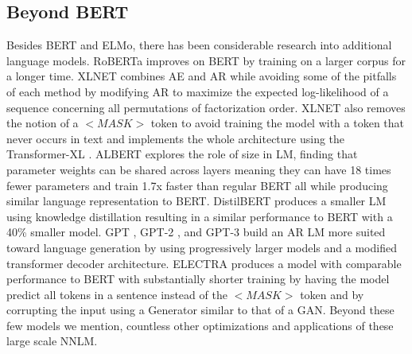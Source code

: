 \subsection{Beyond BERT}
\label{chap:prior:sec:lm:otherlm}
Besides BERT and ELMo, there has been considerable research into additional language models. RoBERTa \cite{Liu2019RoBERTaAR} improves on BERT by training on a larger corpus for a longer time. XLNET \cite{Yang2019XLNetGA} combines AE and AR while avoiding some of the pitfalls of each method by modifying AR to maximize the expected log-likelihood of a sequence concerning all permutations of factorization order. XLNET also removes the notion of a $<MASK>$ token to avoid training the model with a token that never occurs in text and implements the whole architecture using the Transformer-XL \cite{Dai2019TransformerXLAL}. ALBERT \cite{Lan2019ALBERTAL} explores the role of size in LM, finding that parameter weights can be shared across layers meaning they can have 18 times fewer parameters and train 1.7x faster than regular BERT all while producing similar language representation to BERT. DistilBERT \cite{Sanh2019DistilBERTAD} produces a smaller LM using knowledge distillation resulting in a similar performance to BERT with a 40\% smaller model. GPT \cite{Radford2018ImprovingLU}, GPT-2 \cite{Radford2019LanguageMA}, and GPT-3 \cite{Brown2020LanguageMA}  build an AR LM more suited toward language generation by using progressively larger models and a modified transformer decoder architecture. ELECTRA \cite{Clark2020ELECTRAPT} produces a model with comparable performance to BERT with substantially shorter training by having the model predict all tokens in a sentence instead of the $<MASK>$ token and by corrupting the input using a Generator similar to that of a GAN. Beyond these few models we mention, countless other optimizations and applications of these large scale NNLM. 
